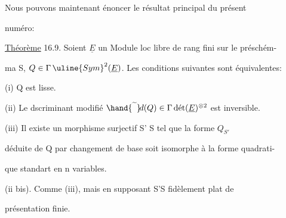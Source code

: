 Nous pouvons maintenant énoncer le résultat principal du présent

numéro:

\uline{Théorème} 16.9. Soient $\underline{E}$ un Module loc libre de rang fini sur le préschém-%

ma S, $Q \in \Gamma\,\uline{Sym}^2(\underline{E})$. Les conditions suivantes sont équivalentes:

(i) Q est lisse.

(ii) Le dscriminant modifié $\hand{\widetilde{\phantom{d}}}\!d(Q) \in \Gamma\,\text{dét}(\underline{E})^{\otimes 2}$ est inversible.

(iii)  Il existe un morphisme surjectif S' \quad S tel que la forme $Q_{S'}$

déduite de Q par changement de base soit isomorphe à la forme quadrati-%

que standart en n variables.

(ii bis). Comme (iii), mais en supposant S'\hand{$\rightarrow$}S fidèlement plat de

présentation finie.

